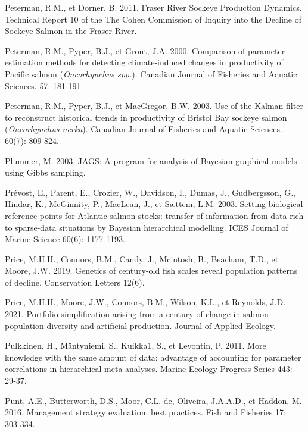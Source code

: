 \documentclass[french,11pt]{book}
\begin{document}
\begin{CSLReferences}{1}{0}
Peterman, R.M., et Dorner, B. 2011. {Fraser River Sockeye Production Dynamics}. Technical Report 10 of the The Cohen Commission of Inquiry into the Decline of Sockeye Salmon in the Fraser River.

Peterman, R.M., Pyper, B.J., et Grout, J.A. 2000. {Comparison of parameter estimation methods for detecting climate-induced changes in productivity of Pacific salmon (}\emph{Oncorhynchus spp.}{)}. {Canadian Journal of Fisheries and Aquatic Sciences.} 57: 181‑191.

Peterman, R.M., Pyper, B.J., et MacGregor, B.W. 2003. {Use of the Kalman filter to reconstruct historical trends in productivity of Bristol Bay sockeye salmon (}\emph{Oncorhynchus nerka}{)}. {Canadian Journal of Fisheries and Aquatic Sciences.} 60(7): 809‑824.

Plummer, M. 2003. JAGS: A program for analysis of Bayesian graphical models using Gibbs sampling.

Prévost, E., Parent, E., Crozier, W., Davidson, I., Dumas, J., Gudbergsson, G., Hindar, K., McGinnity, P., MacLean, J., et Sættem, L.M. 2003. {Setting biological reference points for Atlantic salmon stocks: transfer of information from data-rich to sparse-data situations by Bayesian hierarchical modelling}. ICES Journal of Marine Science 60(6): 1177‑1193.

Price, M.H.H., Connors, B.M., Candy, J., Mcintosh, B., Beacham, T.D., et Moore, J.W. 2019. {Genetics of century-old fish scales reveal population patterns of decline}. Conservation Letters 12(6).

Price, M.H.H., Moore, J.W., Connors, B.M., Wilson, K.L., et Reynolds, J.D. 2021. {Portfolio simplification arising from a century of change in salmon population diversity and artificial production}. {Journal of Applied Ecology}.

Pulkkinen, H., Mäntyniemi, S., Kuikka1, S., et Levontin, P. 2011. {More knowledge with the same amount of data: advantage of accounting for parameter correlations in hierarchical meta-analyses}. Marine Ecology Progress Series 443: 29‑37.

Punt, A.E., Butterworth, D.S., Moor, C.L. de, Oliveira, J.A.A.D., et Haddon, M. 2016. {Management strategy evaluation: best practices}. Fish and Fisheries 17: 303‑334.


\end{CSLReferences}
\end{document}
